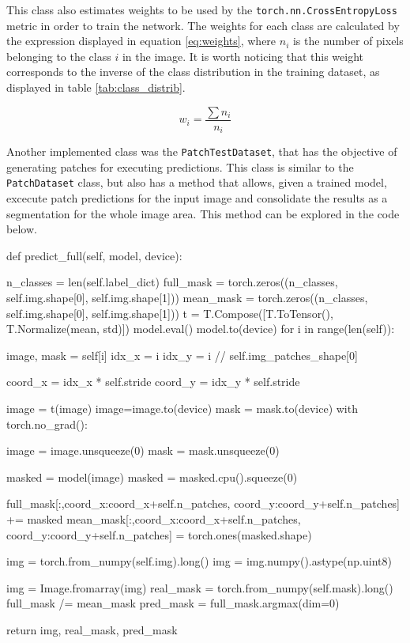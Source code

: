 \documentclass[10pt, a4paper]{article}
\begin{document}
This class also estimates weights to be used by the {\tt torch.nn.CrossEntropyLoss} metric in order to train the network. The weights for each class are calculated by
the expression displayed in equation \ref{eq:weights}, where $n_i$ is the number of pixels belonging to the class $i$ in the image. It is worth noticing that this
weight corresponds to the inverse of the class distribution in the training dataset, as displayed in table \ref{tab:class_distrib}.

\begin{equation}\label{eq:weights}
  w_i = \frac{\sum{n_i}}{n_i}
\end{equation}

Another implemented class was the {\tt PatchTestDataset}, that has the objective of generating patches for executing predictions. This class is similar to the {\tt PatchDataset}
class, but also has a method that allows, given a trained model, excecute patch predictions for the input image and consolidate the results as a segmentation for the whole image area.
This method can be explored in the code below.

\begin{python}
    def predict_full(self, model, device):

      n_classes = len(self.label_dict)
      full_mask = torch.zeros((n_classes, self.img.shape[0], self.img.shape[1]))
      mean_mask = torch.zeros((n_classes, self.img.shape[0], self.img.shape[1]))
      t = T.Compose([T.ToTensor(), T.Normalize(mean, std)])
      model.eval()
      model.to(device)
      for i in range(len(self)):

        image, mask = self[i]
        idx_x = i %
        idx_y = i // self.img_patches_shape[0]

        coord_x = idx_x * self.stride
        coord_y = idx_y * self.stride

        image = t(image)
        image=image.to(device)
        mask = mask.to(device)
        with torch.no_grad():

          image = image.unsqueeze(0)
          mask = mask.unsqueeze(0)

          masked = model(image)
          masked = masked.cpu().squeeze(0)

        full_mask[:,coord_x:coord_x+self.n_patches, coord_y:coord_y+self.n_patches] += masked
        mean_mask[:,coord_x:coord_x+self.n_patches, coord_y:coord_y+self.n_patches] = torch.ones(masked.shape)
  
      img = torch.from_numpy(self.img).long()
      img = img.numpy().astype(np.uint8)

      img = Image.fromarray(img)
      real_mask = torch.from_numpy(self.mask).long()
      full_mask /= mean_mask
      pred_mask = full_mask.argmax(dim=0)

      return img, real_mask, pred_mask
\end{python}
\end{document}
